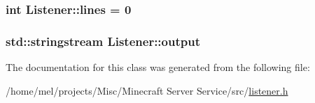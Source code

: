 \subsubsection[{\texorpdfstring{lines}{lines}}]{\setlength{\rightskip}{0pt plus 5cm}int Listener\+::lines = 0}\hypertarget{class_listener_aa431d105681b1ed7f7e87d9943489eac}{}\label{class_listener_aa431d105681b1ed7f7e87d9943489eac}
\subsubsection[{\texorpdfstring{output}{output}}]{\setlength{\rightskip}{0pt plus 5cm}std\+::stringstream Listener\+::output}\hypertarget{class_listener_afa3c8712c22ea0d08e53a875b6a5fc24}{}\label{class_listener_afa3c8712c22ea0d08e53a875b6a5fc24}


The documentation for this class was generated from the following file\+:\begin{DoxyCompactItemize}
\item 
/home/mel/projects/\+Misc/\+Minecraft Server Service/src/\hyperlink{listener_8h}{listener.\+h}\end{DoxyCompactItemize}
